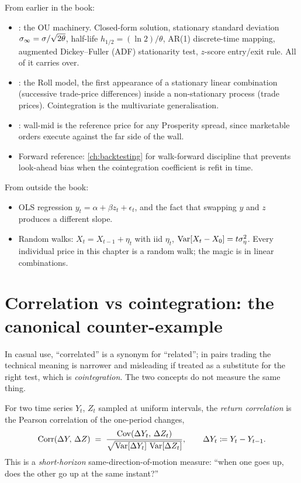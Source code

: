 \begin{backgroundbox}[Prerequisites]
From earlier in the book:
\begin{itemize}
  \item {}: the OU machinery. Closed-form
  solution, stationary standard deviation
  $\sigma_\infty = \sigma/\sqrt{2\theta}$, half-life
  $h_{1/2} = (\ln 2)/\theta$, AR(1) discrete-time mapping,
  augmented Dickey--Fuller (ADF) stationarity test, $z$-score
  entry/exit rule. All of it carries over.
  \item {}: the Roll model, the first appearance
  of a stationary linear combination (successive trade-price
  differences) inside a non-stationary process (trade prices).
  Cointegration is the multivariate generalisation.
  \item {}: wall-mid is the reference price for
  any Prosperity spread, since marketable orders execute against
  the far side of the wall.
  \item Forward reference: \cref{ch:backtesting} for walk-forward
  discipline that prevents look-ahead bias when the cointegration
  coefficient is refit in time.
\end{itemize}
From outside the book:
\begin{itemize}
  \item OLS regression $y_t = \alpha + \beta z_t + \epsilon_t$, and
  the fact that swapping $y$ and $z$ produces a different slope.
  \item Random walks: $X_t = X_{t-1} + \eta_t$ with iid $\eta_t$,
  $\operatorname{Var}[X_t - X_0] = t\sigma_\eta^2$. Every individual price in
  this chapter is a random walk; the magic is in linear
  combinations.
\end{itemize}
\end{backgroundbox}

\section{Correlation vs cointegration: the canonical counter-example}
\label{sec:ch10_corrvscoint}

In casual use, ``correlated'' is a synonym for ``related''; in
pairs trading the technical meaning is narrower and misleading if
treated as a substitute for the right test, which is
\emph{cointegration}. The two concepts do not measure the same
thing.

\begin{definition}
\label{def:return_corr}
For two time series $Y_t$, $Z_t$ sampled at uniform intervals,
the \emph{return correlation} is the Pearson correlation of the
one-period changes,
\begin{equation}
  \operatorname{Corr}(\Delta Y,\,\Delta Z)
  \;=\; \frac{\operatorname{Cov}(\Delta Y_t,\,\Delta Z_t)}
              {\sqrt{\operatorname{Var}[\Delta Y_t]\,\operatorname{Var}[\Delta Z_t]}},
  \qquad \Delta Y_t \coloneqq Y_t - Y_{t-1}.
\end{equation}
This is a \emph{short-horizon} same-direction-of-motion measure:
``when one goes up, does the other go up at the same instant?''
\end{definition}

